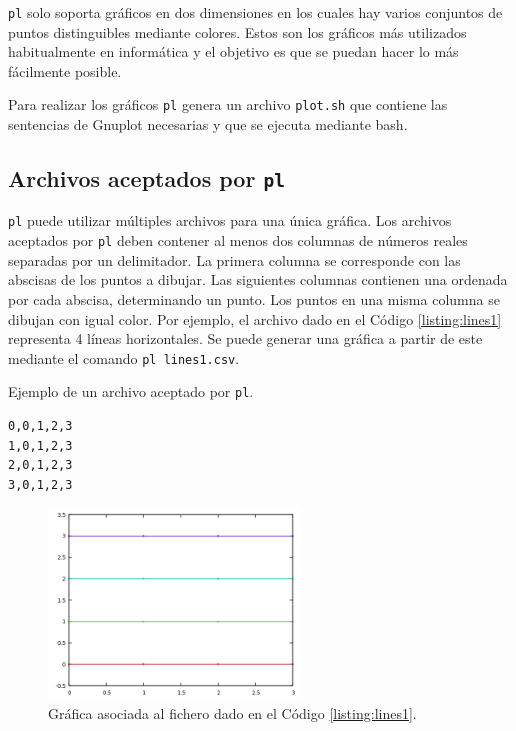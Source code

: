\documentclass{article}
\begin{document}
		\texttt{pl} solo soporta gráficos en dos dimensiones en los cuales hay varios conjuntos de puntos distinguibles mediante colores. Estos son los gráficos más utilizados habitualmente en informática y el objetivo es que se puedan hacer lo más fácilmente posible.

		Para realizar los gráficos \texttt{pl} genera un archivo \texttt{plot.sh} que contiene las sentencias de Gnuplot necesarias y que se ejecuta mediante bash.
	
	\subsection{Archivos aceptados por \texttt{pl}} \label{sec:pl:arguments}
		
		\texttt{pl} puede utilizar múltiples archivos para una única gráfica. Los archivos aceptados por \texttt{pl} deben contener al menos dos columnas de números reales separadas por un delimitador. La primera columna se corresponde con las abscisas de los puntos a dibujar. Las siguientes columnas contienen una ordenada por cada abscisa, determinando un punto. Los puntos en una misma columna se dibujan con igual color. Por ejemplo, el archivo dado en el Código \ref{listing:lines1} representa 4 líneas horizontales. Se puede generar una gráfica a partir de este mediante el comando \texttt{pl lines1.csv}.

		\begin{listing}
			\caption{Ejemplo de un archivo aceptado por \texttt{pl}.}
			\begin{verbatim}
0,0,1,2,3
1,0,1,2,3
2,0,1,2,3
3,0,1,2,3
			\end{verbatim}
			\label{listing:lines1}
		\end{listing}
		
        \begin{figure}[H]
        	\centering
        	\includegraphics[width=0.6\textwidth]{../../images/lines1.png}
        	\caption{Gráfica asociada al fichero dado en el Código \ref{listing:lines1}.}
        	\label{fig:lines1}
        \end{figure}
\end{document}

